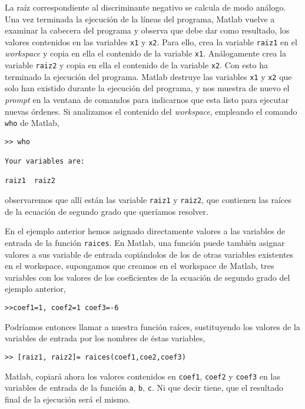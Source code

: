 La raíz correspondiente al discriminante negativo se calcula de modo análogo. Una vez terminada la ejecución de la líneas del programa, Matlab vuelve a examinar la cabecera del programa y observa que debe dar como resultado, los valores contenidos en las variables \texttt{x1} y \texttt{x2}. Para ello, crea la variable \texttt{raiz1}  en el \emph{workspace} y copia en ella el contenido de la variable \texttt{x1}. Análogamente crea la variable \texttt{raiz2} y copia en ella el contenido de la variable \texttt{x2}. Con esto ha terminado la ejecución del programa. Matlab destruye las variables \texttt{x1} y \texttt{x2} que solo han existido durante la ejecución del programa, y nos muestra de nuevo el \emph{prompt} en la ventana de comandos para indicarnos que esta listo para ejecutar nuevas órdenes. Si analizamos el contenido del \emph{workspace}, empleando el comando \texttt{who} de Matlab,
\begin{verbatim}
>> who

Your variables are:

raiz1  raiz2  

\end{verbatim}
observaremos que allí están las variable \texttt{raiz1} y \texttt{raiz2}, que contienen las raíces de la ecuación de segundo grado que queríamos resolver.

En el ejemplo anterior hemos asignado directamente valores a las variables de entrada de la función \texttt{raices}. En Matlab, una función puede también asignar valores a sus variable de entrada copiándolos de los de otras variables existentes en el workspace, supongamos que creamos en el workspace de Matlab, tres variables con los valores de los coeficientes de la ecuación de segundo grado del ejemplo anterior,
\begin{verbatim}
>>coef1=1, coef2=1 coef3=-6
\end{verbatim}

Podríamos entonces llamar a nuestra función raíces, sustituyendo los valores de la variables de entrada por los nombres de éstas variables,

\begin{verbatim}
>> [raiz1, raiz2]= raices(coef1,coe2,coef3)
\end{verbatim} 
 Matlab, copiará ahora los valores contenidos en \texttt{coef1}, \texttt{coef2} y \texttt{coef3} en las variables de entrada de la función \texttt{a}, \texttt{b}, \texttt{c}. Ni que decir tiene, que el resultado final de la ejecución será el mismo.


